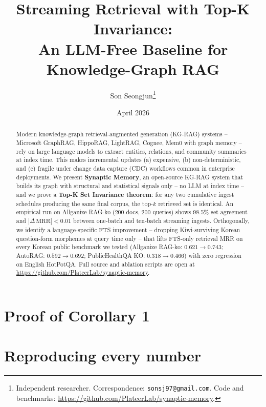 \documentclass[11pt]{article}
\title{Streaming Retrieval with Top-K Invariance:\\
An LLM-Free Baseline for Knowledge-Graph RAG}
\author{%
  Son Seongjun\thanks{Independent researcher. Correspondence: \texttt{sonsj97@gmail.com}. Code and benchmarks: \url{https://github.com/PlateerLab/synaptic-memory}.}%
}
\date{April 2026}
\theoremstyle{plain}
\theoremstyle{definition}
\begin{document}
\maketitle

\begin{abstract}
Modern knowledge-graph retrieval-augmented generation (KG-RAG) systems --
Microsoft GraphRAG, HippoRAG, LightRAG, Cognee, Mem0 with graph memory --
rely on large language models to extract entities, relations, and
community summaries at index time. This makes incremental updates (a)
expensive, (b) non-deterministic, and (c) fragile under change data
capture (CDC) workflows common in enterprise deployments. We present
\textbf{Synaptic Memory}, an open-source KG-RAG system that builds its
graph with structural and statistical signals only -- no LLM at index
time -- and we prove a \textbf{Top-K Set Invariance theorem}: for any
two cumulative ingest schedules producing the same final corpus, the
top-$k$ retrieved set is identical. An empirical run on Allganize
RAG-ko (200 docs, 200 queries) shows 98.5\% set agreement and $|\Delta\,\mathrm{MRR}| < 0.01$ between one-batch and ten-batch streaming ingests.
Orthogonally, we identify a language-specific FTS improvement -- dropping
Kiwi-surviving Korean question-form morphemes at query time only -- that
lifts FTS-only retrieval MRR on every Korean public benchmark we tested
(Allganize RAG-ko: $0.621 \to 0.743$; AutoRAG: $0.592 \to 0.692$;
PublicHealthQA KO: $0.318 \to 0.466$) with zero regression on English
HotPotQA. Full source and ablation scripts are open at
\url{https://github.com/PlateerLab/synaptic-memory}.
\end{abstract}














\appendix

\section{Proof of Corollary 1}


\section{Reproducing every number}

\end{document}
